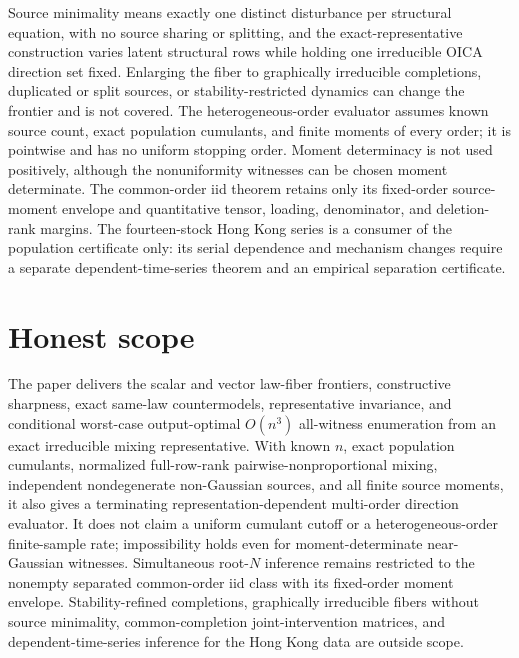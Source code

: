 \documentclass{article}
\begin{document}
Source minimality means exactly one distinct disturbance per structural equation, with no source sharing or splitting, and the exact-representative construction varies latent structural rows while holding one irreducible OICA direction set fixed. Enlarging the fiber to graphically irreducible completions, duplicated or split sources, or stability-restricted dynamics can change the frontier and is not covered. The heterogeneous-order evaluator assumes known source count, exact population cumulants, and finite moments of every order; it is pointwise and has no uniform stopping order. Moment determinacy is not used positively, although the nonuniformity witnesses can be chosen moment determinate. The common-order iid theorem retains only its fixed-order source-moment envelope and quantitative tensor, loading, denominator, and deletion-rank margins. The fourteen-stock Hong Kong series is a consumer of the population certificate only: its serial dependence and mechanism changes require a separate dependent-time-series theorem and an empirical separation certificate.

\section{Honest scope}

The paper delivers the scalar and vector law-fiber frontiers, constructive sharpness, exact same-law countermodels, representative invariance, and conditional worst-case output-optimal \(O(n^3)\) all-witness enumeration from an exact irreducible mixing representative. With known \(n\), exact population cumulants, normalized full-row-rank pairwise-nonproportional mixing, independent nondegenerate non-Gaussian sources, and all finite source moments, it also gives a terminating representation-dependent multi-order direction evaluator. It does not claim a uniform cumulant cutoff or a heterogeneous-order finite-sample rate; impossibility holds even for moment-determinate near-Gaussian witnesses. Simultaneous root-\(N\) inference remains restricted to the nonempty separated common-order iid class with its fixed-order moment envelope. Stability-refined completions, graphically irreducible fibers without source minimality, common-completion joint-intervention matrices, and dependent-time-series inference for the Hong Kong data are outside scope.
\end{document}
